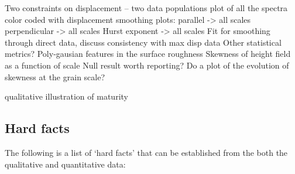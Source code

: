 \documentclass[12pt,a4paper]{article}
\begin{document}
Two constraints on displacement – two data populations
plot of all the spectra color coded with displacement
smoothing plots:
	parallel -> all scales
	perpendicular -> all scales
	Hurst exponent -> all scales
Fit for smoothing through direct data, discuss consistency with max disp data
Other statistical metrics?
	Poly-gausian features in the surface roughness
	Skewness of height field as a function of scale
		Null result worth reporting?
		Do a plot of the evolution of skewness at the grain scale?




qualitative illustration of maturity


\subsection{Hard facts}

The following is a list of  `hard facts' that can be established from the both the qualitative and quantitative data:
\end{document}

